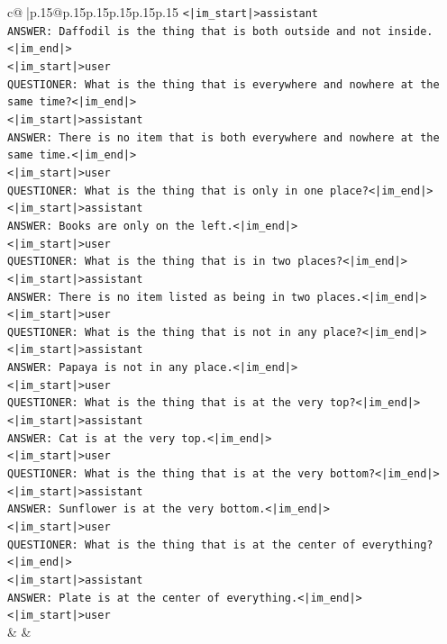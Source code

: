 \documentclass{article}
\begin{document}
{\begin{supertabular}{c@{$\;$}|p{.15\linewidth}@{}p{.15\linewidth}p{.15\linewidth}p{.15\linewidth}p{.15\linewidth}p{.15\linewidth}}
{{{\texttt{<|im\_start|>assistant} \\
\texttt{ANSWER: Daffodil is the thing that is both outside and not inside.<|im\_end|>} \\
\texttt{<|im\_start|>user} \\
\texttt{QUESTIONER: What is the thing that is everywhere and nowhere at the same time?<|im\_end|>} \\
\texttt{<|im\_start|>assistant} \\
\texttt{ANSWER: There is no item that is both everywhere and nowhere at the same time.<|im\_end|>} \\
\texttt{<|im\_start|>user} \\
\texttt{QUESTIONER: What is the thing that is only in one place?<|im\_end|>} \\
\texttt{<|im\_start|>assistant} \\
\texttt{ANSWER: Books are only on the left.<|im\_end|>} \\
\texttt{<|im\_start|>user} \\
\texttt{QUESTIONER: What is the thing that is in two places?<|im\_end|>} \\
\texttt{<|im\_start|>assistant} \\
\texttt{ANSWER: There is no item listed as being in two places.<|im\_end|>} \\
\texttt{<|im\_start|>user} \\
\texttt{QUESTIONER: What is the thing that is not in any place?<|im\_end|>} \\
\texttt{<|im\_start|>assistant} \\
\texttt{ANSWER: Papaya is not in any place.<|im\_end|>} \\
\texttt{<|im\_start|>user} \\
\texttt{QUESTIONER: What is the thing that is at the very top?<|im\_end|>} \\
\texttt{<|im\_start|>assistant} \\
\texttt{ANSWER: Cat is at the very top.<|im\_end|>} \\
\texttt{<|im\_start|>user} \\
\texttt{QUESTIONER: What is the thing that is at the very bottom?<|im\_end|>} \\
\texttt{<|im\_start|>assistant} \\
\texttt{ANSWER: Sunflower is at the very bottom.<|im\_end|>} \\
\texttt{<|im\_start|>user} \\
\texttt{QUESTIONER: What is the thing that is at the center of everything?<|im\_end|>} \\
\texttt{<|im\_start|>assistant} \\
\texttt{ANSWER: Plate is at the center of everything.<|im\_end|>} \\
\texttt{<|im\_start|>user} \\
            }
        }
    }
    & & \\ \\


\end{supertabular}}
\end{document}
